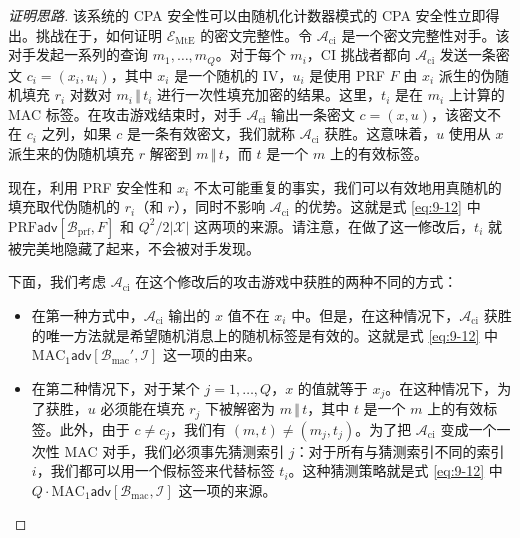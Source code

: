 \begin{proof}[证明思路]
该系统的 CPA 安全性可以由随机化计数器模式的 CPA 安全性立即得出。挑战在于，如何证明 $\mathcal{E}_\mathrm{MtE}$ 的密文完整性。令 $\mathcal{A}_\mathrm{ci}$ 是一个密文完整性对手。该对手发起一系列的查询 $m_1,\dots,m_Q$。对于每个 $m_i$，CI 挑战者都向 $\mathcal{A}_\mathrm{ci}$ 发送一条密文 $c_i=(x_i,u_i)$，其中 $x_i$ 是一个随机的 IV，$u_i$ 是使用 PRF $F$ 由 $x_i$ 派生的伪随机填充 $r_i$ 对数对 $m_i\,\Vert\,t_i$ 进行一次性填充加密的结果。这里，$t_i$ 是在 $m_i$ 上计算的 MAC 标签。在攻击游戏结束时，对手 $\mathcal{A}_\mathrm{ci}$ 输出一条密文 $c=(x,u)$，该密文不在 $c_i$ 之列，如果 $c$ 是一条有效密文，我们就称 $\mathcal{A}_\mathrm{ci}$ 获胜。这意味着，$u$ 使用从 $x$ 派生来的伪随机填充 $r$ 解密到 $m\,\Vert\,t$，而 $t$ 是一个 $m$ 上的有效标签。

现在，利用 PRF 安全性和 $x_i$ 不太可能重复的事实，我们可以有效地用真随机的填充取代伪随机的 $r_i$（和 $r$），同时不影响 $\mathcal{A}_\mathrm{ci}$ 的优势。这就是式 \ref{eq:9-12} 中 $\mathrm{PRF}\mathsf{adv}[\mathcal{B}_\mathrm{prf},F]$ 和 $Q^2/2|\mathcal{X}|$ 这两项的来源。请注意，在做了这一修改后，$t_i$ 就被完美地隐藏了起来，不会被对手发现。

下面，我们考虑 $\mathcal{A}_\mathrm{ci}$ 在这个修改后的攻击游戏中获胜的两种不同的方式：
\begin{itemize}
	\item 在第一种方式中，$\mathcal{A}_\mathrm{ci}$ 输出的 $x$ 值不在 $x_i$ 中。但是，在这种情况下，$\mathcal{A}_\mathrm{ci}$ 获胜的唯一方法就是希望随机消息上的随机标签是有效的。这就是式 \ref{eq:9-12} 中 $\mathrm{MAC}_1\mathsf{adv}[\mathcal{B}_\mathrm{mac}',\mathcal{I}]$ 这一项的由来。
	\item 在第二种情况下，对于某个 $j=1,\dots,Q$，$x$ 的值就等于 $x_j$。在这种情况下，为了获胜，$u$ 必须能在填充 $r_j$ 下被解密为 $m\,\Vert\,t$，其中 $t$ 是一个 $m$ 上的有效标签。此外，由于 $c\neq c_j$，我们有 $(m,t)\neq(m_j,t_j)$。为了把 $\mathcal{A}_\mathrm{ci}$ 变成一个一次性 MAC 对手，我们必须事先猜测索引 $j$：对于所有与猜测索引不同的索引 $i$，我们都可以用一个假标签来代替标签 $t_i$。这种猜测策略就是式 \ref{eq:9-12} 中 $Q\cdot\mathrm{MAC}_1\mathsf{adv}[\mathcal{B}_\mathrm{mac},\mathcal{I}]$ 这一项的来源。\qedhere
\end{itemize}
\end{proof}

